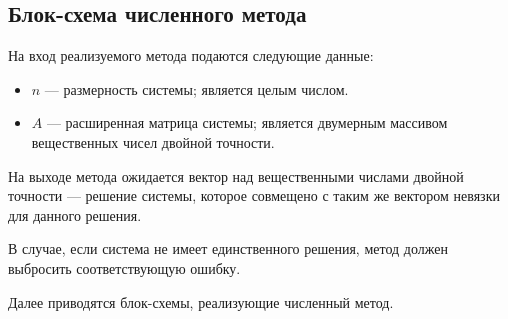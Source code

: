 \subsection{Блок-схема численного метода}

На вход реализуемого метода подаются следующие данные:

\begin{itemize}
  \item \( n \) --- размерность системы; является целым числом.
  \item \( A \) --- расширенная матрица системы; является двумерным массивом вещественных чисел двойной точности.
\end{itemize}

На выходе метода ожидается вектор над вещественными числами двойной точности --- решение системы, которое совмещено с таким же вектором невязки для данного решения.

В случае, если система не имеет единственного решения, метод должен выбросить соответствующую ошибку.

Далее приводятся блок-схемы, реализующие численный метод.

